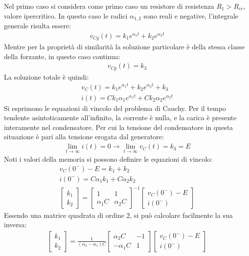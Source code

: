 \documentclass{article}
\numberwithin{equation}{subsection}
\begin{document}
Nel primo caso si considera come primo caso un resistore di resistenza $R_1>R_{cr}$, valore ipercritico. In questo caso le radici $\alpha_{1,2}$ sono reali e negative, l'integrale generale 
risulta essere:
\begin{gather*}
    v_{Cg}(t)=k_1e^{\alpha_1t}+k_2e^{\alpha_2t}
\end{gather*}
Mentre per la proprietà di similarità la soluzione particolare è della stessa classe della forzante, in questo caso continua:
\begin{gather*}
    v_{Cp}(t)=k_3
\end{gather*}
La soluzione totale è quindi:
\begin{gather*}
    v_C(t)=k_1e^{\alpha_1t}+k_2e^{\alpha_2t}+k_3\\
    i(t)=Ck_1\alpha_1e^{\alpha_1t}+Ck_2\alpha_2e^{\alpha_2t}
\end{gather*}
Si esprimono le equazioni di vincolo del problema di Cauchy. Per il tempo tendente asintoticamente all'infinito, la corrente è nulla, e la carica è presente interamente nel 
condensatore. Per cui la tensione del condensatore in questa situazione è pari alla tensione erogata dal generatore: 
\begin{gather*}
    \lim_{t\to\infty}i(t)=0\rightarrow \lim_{t\to\infty}v_C(t)=k_3=E
\end{gather*}
Noti i valori della memoria si possono definire le equazioni di vincolo:
\begin{gather*}
    v_C(0^-)-E=k_1+k_2\\
    i(0^-)=C\alpha_1k_1+C\alpha_2k_2\\
    \begin{bmatrix}
        k_1\\k_2
    \end{bmatrix}=\begin{bmatrix}
        1&1\\\alpha_1C&\alpha_2C
    \end{bmatrix}^{-1}\begin{bmatrix}
        v_C(0^-)-E\\i(0^-)
    \end{bmatrix}
\end{gather*}
Essendo una matrice quadrata di ordine $2$, si può calcolare facilmente la sua inversa:
\begin{gather*}
    \begin{bmatrix}
        k_1\\k_2
    \end{bmatrix}=\displaystyle\frac{1}{(\alpha_2-\alpha_1)C}\begin{bmatrix}
        \alpha_2C&-1\\-\alpha_1C&1
    \end{bmatrix}\begin{bmatrix}
        v_C(0^-)-E\\i(0^-)
    \end{bmatrix}
\end{gather*}
\end{document}
